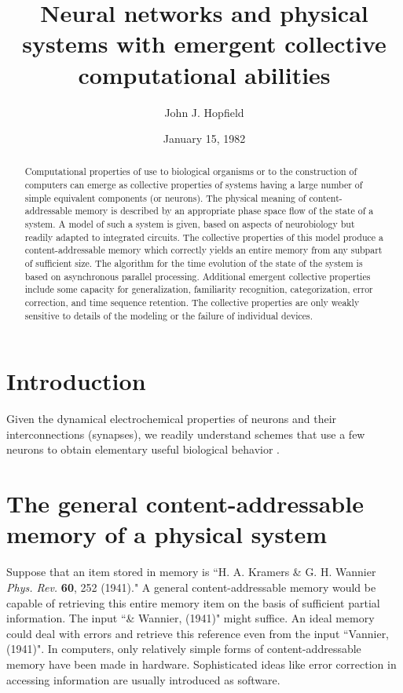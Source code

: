 \documentclass[10pt,letterpaper]{article}
\title{Neural networks and physical systems with emergent collective computational abilities}
\author{John J. Hopfield}
\date{January 15, 1982}
\begin{document}
	\maketitle
	
	\begin{abstract}
		Computational properties of use to biological organisms or to the construction of computers can emerge as collective properties of systems having a large number of simple equivalent components (or neurons). The physical meaning of content-addressable memory is described by an appropriate phase space flow of the state of a system. A model of such a system is given, based on aspects of neurobiology but readily adapted to integrated circuits. The collective properties of this model produce a content-addressable memory which correctly yields an entire memory from any subpart of sufficient size. The algorithm for the time evolution of the state of the system is based on asynchronous parallel processing. Additional emergent collective properties include some capacity for generalization, familiarity recognition, categorization, error correction, and time sequence retention. The collective properties are only weakly sensitive to details of the modeling or the failure of individual devices.
	\end{abstract}
	
	\section{Introduction}
	Given the dynamical electrochemical properties of neurons and their interconnections (synapses), we readily understand schemes that use a few neurons to obtain elementary useful biological behavior \cite{willows1973neuronal,kristan1980generation}.
	
	\section{The general content-addressable memory of a physical system}
	Suppose that an item stored in memory is ``H. A. Kramers \& G. H. Wannier \textit{Phys. Rev.} \textbf{60}, 252 (1941)." A general content-addressable memory would be capable of retrieving this entire memory item on the basis of sufficient partial information. The input ``\& Wannier, (1941)" might suffice. An ideal memory could deal with errors and retrieve this reference even from the input ``Vannier, (1941)". In computers, only relatively simple forms of content-addressable memory have been made in hardware. Sophisticated ideas like error correction in accessing information are usually introduced as software. 
	
\end{document}
